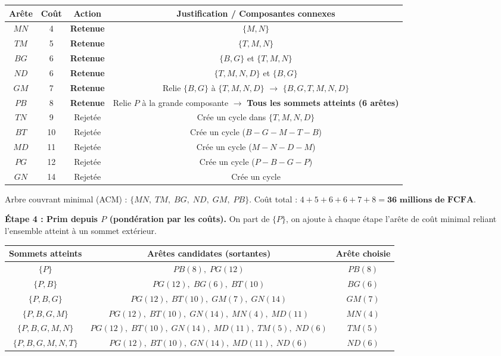 \documentclass[11pt]{article}
\begin{document}
\begin{exoresolu}
\begin{center}
\begin{tabular}{|c|c|c|c|}
\hline
\rowcolor{popblueL} \textbf{Arête} & \textbf{Coût} & \textbf{Action} & \textbf{Justification / Composantes connexes} \\
\hline
$MN$ & 4 & \textbf{Retenue} & $\{M,N\}$ \\
\hline
$TM$ & 5 & \textbf{Retenue} & $\{T,M,N\}$ \\
\hline
$BG$ & 6 & \textbf{Retenue} & $\{B,G\}$ et $\{T,M,N\}$ \\
\hline
$ND$ & 6 & \textbf{Retenue} & $\{T,M,N,D\}$ et $\{B,G\}$ \\
\hline
$GM$ & 7 & \textbf{Retenue} & Relie $\{B,G\}$ à $\{T,M,N,D\}$ $\to$ $\{B,G,T,M,N,D\}$ \\
\hline
$PB$ & 8 & \textbf{Retenue} & Relie $P$ à la grande composante $\to$ \textbf{Tous les sommets atteints (6 arêtes)} \\
\hline
$TN$ & 9 & Rejetée & Crée un cycle dans $\{T,M,N,D\}$ \\
\hline
$BT$ & 10 & Rejetée & Crée un cycle ($B-G-M-T-B$) \\
\hline
$MD$ & 11 & Rejetée & Crée un cycle ($M-N-D-M$) \\
\hline
$PG$ & 12 & Rejetée & Crée un cycle ($P-B-G-P$) \\
\hline
$GN$ & 14 & Rejetée & Crée un cycle \\
\hline
\end{tabular}
\end{center}

Arbre couvrant minimal (ACM) : $\{MN,\; TM,\; BG,\; ND,\; GM,\; PB\}$.
Coût total : $4 + 5 + 6 + 6 + 7 + 8 = \textbf{36 millions de FCFA}$.

\textbf{Étape 4 : Prim depuis $P$ (pondération par les coûts).}
On part de $\{P\}$, on ajoute à chaque étape l'arête de coût minimal reliant l'ensemble atteint à un sommet extérieur.

\begin{center}
\begin{tabular}{|c|c|c|}
\hline
\rowcolor{popblueL} \textbf{Sommets atteints} & \textbf{Arêtes candidates (sortantes)} & \textbf{Arête choisie} \\
\hline
$\{P\}$ & $PB(8),\; PG(12)$ & $PB(8)$ \\
\hline
$\{P,B\}$ & $PG(12),\; BG(6),\; BT(10)$ & $BG(6)$ \\
\hline
$\{P,B,G\}$ & $PG(12),\; BT(10),\; GM(7),\; GN(14)$ & $GM(7)$ \\
\hline
$\{P,B,G,M\}$ & $PG(12),\; BT(10),\; GN(14),\; MN(4),\; MD(11)$ & $MN(4)$ \\
\hline
$\{P,B,G,M,N\}$ & $PG(12),\; BT(10),\; GN(14),\; MD(11),\; TM(5),\; ND(6)$ & $TM(5)$ \\
\hline
$\{P,B,G,M,N,T\}$ & $PG(12),\; BT(10),\; GN(14),\; MD(11),\; ND(6)$ & $ND(6)$ \\
\hline
\end{tabular}
\end{center}


\end{exoresolu}
\end{document}
